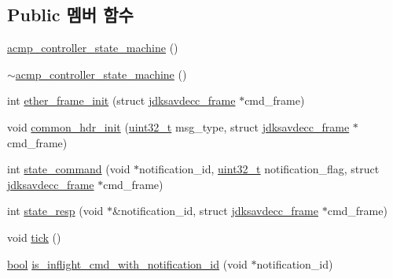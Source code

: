 \subsection*{Public 멤버 함수}
\begin{DoxyCompactItemize}
\item 
\hyperlink{classavdecc__lib_1_1acmp__controller__state__machine_a2f1e9cfe35d0ddaf473cafe9f62913c7}{acmp\+\_\+controller\+\_\+state\+\_\+machine} ()
\item 
\hyperlink{classavdecc__lib_1_1acmp__controller__state__machine_a00a722af6db0f936f7c26773a34c674c}{$\sim$acmp\+\_\+controller\+\_\+state\+\_\+machine} ()
\item 
int \hyperlink{classavdecc__lib_1_1acmp__controller__state__machine_a0a43868a3e99a6cef740e4562d006345}{ether\+\_\+frame\+\_\+init} (struct \hyperlink{structjdksavdecc__frame}{jdksavdecc\+\_\+frame} $\ast$cmd\+\_\+frame)
\item 
void \hyperlink{classavdecc__lib_1_1acmp__controller__state__machine_ae93a117baf9620a7311f950271610506}{common\+\_\+hdr\+\_\+init} (\hyperlink{parse_8c_a6eb1e68cc391dd753bc8ce896dbb8315}{uint32\+\_\+t} msg\+\_\+type, struct \hyperlink{structjdksavdecc__frame}{jdksavdecc\+\_\+frame} $\ast$cmd\+\_\+frame)
\item 
int \hyperlink{classavdecc__lib_1_1acmp__controller__state__machine_a96616c92d34da4a6859d5a653691e21b}{state\+\_\+command} (void $\ast$notification\+\_\+id, \hyperlink{parse_8c_a6eb1e68cc391dd753bc8ce896dbb8315}{uint32\+\_\+t} notification\+\_\+flag, struct \hyperlink{structjdksavdecc__frame}{jdksavdecc\+\_\+frame} $\ast$cmd\+\_\+frame)
\item 
int \hyperlink{classavdecc__lib_1_1acmp__controller__state__machine_affdd2e72c0e7a518e4b8993e23750aa9}{state\+\_\+resp} (void $\ast$\&notification\+\_\+id, struct \hyperlink{structjdksavdecc__frame}{jdksavdecc\+\_\+frame} $\ast$cmd\+\_\+frame)
\item 
void \hyperlink{classavdecc__lib_1_1acmp__controller__state__machine_a873dd91783f9efb4a590aded1f70d6b0}{tick} ()
\item 
\hyperlink{avb__gptp_8h_af6a258d8f3ee5206d682d799316314b1}{bool} \hyperlink{classavdecc__lib_1_1acmp__controller__state__machine_aa5c3cd6eac3ef43eb32c176106a182e6}{is\+\_\+inflight\+\_\+cmd\+\_\+with\+\_\+notification\+\_\+id} (void $\ast$notification\+\_\+id)
\end{DoxyCompactItemize}
